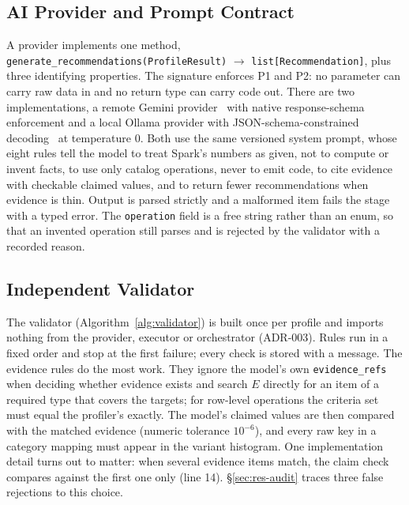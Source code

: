 \subsection{AI Provider and Prompt Contract}
A provider implements one method, \texttt{generate\_\allowbreak{}recommendations(\allowbreak{}ProfileResult)} $\to$ \texttt{list[\allowbreak{}Recommendation]}, plus three identifying properties. The signature enforces P1 and P2: no parameter can carry raw data in and no return type can carry code out. There are two implementations, a remote Gemini provider~\cite{gemini2023} with native response-schema enforcement and a local Ollama provider with JSON-schema-constrained decoding~\cite{willard2023outlines} at temperature 0. Both use the same versioned system prompt, whose eight rules tell the model to treat Spark's numbers as given, not to compute or invent facts, to use only catalog operations, never to emit code, to cite evidence with checkable claimed values, and to return fewer recommendations when evidence is thin. Output is parsed strictly and a malformed item fails the stage with a typed error. The \texttt{operation} field is a free string rather than an enum, so that an invented operation still parses and is rejected by the validator with a recorded reason.

\subsection{Independent Validator}
The validator (Algorithm~\ref{alg:validator}) is built once per profile and imports nothing from the provider, executor or orchestrator (ADR-003). Rules run in a fixed order and stop at the first failure; every check is stored with a message. The evidence rules do the most work. They ignore the model's own \texttt{evidence\_refs} when deciding whether evidence exists and search $E$ directly for an item of a required type that covers the targets; for row-level operations the criteria set must equal the profiler's exactly. The model's claimed values are then compared with the matched evidence (numeric tolerance $10^{-6}$), and every raw key in a category mapping must appear in the variant histogram. One implementation detail turns out to matter: when several evidence items match, the claim check compares against the first one only (line 14). \S\ref{sec:res-audit} traces three false rejections to this choice.

